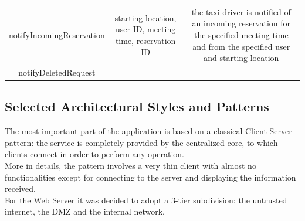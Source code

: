 \documentclass{article}
\begin{document}
\begin{itemize}
\begin{itemize}
\begin{adjustbox}{width=1.2\textwidth}
\begin{tabular}{*{3}{c}}
							notifyIncomingReservation & starting location, user ID, meeting time, reservation ID & the taxi driver is notified of an incoming reservation for the specified meeting time and from the specified user and starting location \\
							notifyDeletedRequest %
							\bottomrule
						\end{tabular}
					\end{adjustbox}	
			\end{itemize}		
	\end{itemize}
	\subsection{Selected Architectural Styles and Patterns}
	The most important part of the application is based on a classical Client-Server pattern: the service is completely provided by the centralized core, to which clients connect in order to perform any operation.\\
	More in details, the pattern involves a very thin client with almost no functionalities except for connecting to the server and displaying the information received.\\
	For the Web Server it was decided to adopt a 3-tier subdivision: the untrusted internet, the DMZ and the internal network. %
\end{document}
